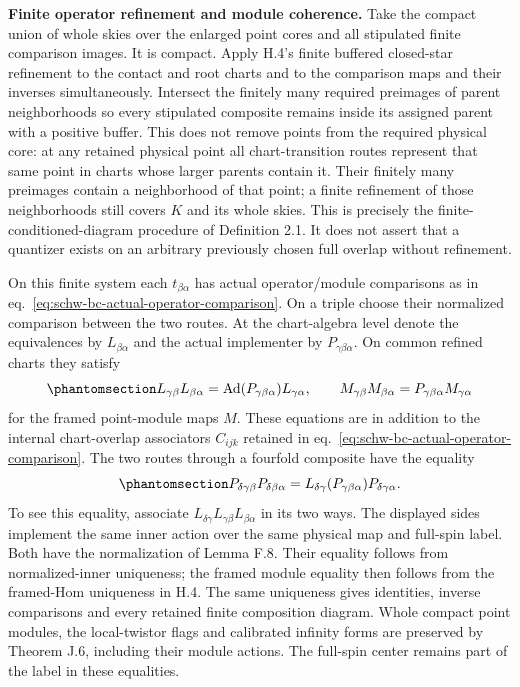\documentclass[
  english,
  11pt,
  reqno]{amsart}
\begin{document}
\textbf{Finite operator refinement and module coherence.} Take the
compact union of whole skies over the enlarged point cores and all
stipulated finite comparison images. It is compact. Apply H.4's finite
buffered closed-star refinement to the contact and root charts and to
the comparison maps and their inverses simultaneously. Intersect the
finitely many required preimages of parent neighborhoods so every
stipulated composite remains inside its assigned parent with a positive
buffer. This does not remove points from the required physical core: at
any retained physical point all chart-transition routes represent that
same point in charts whose larger parents contain it. Their finitely
many preimages contain a neighborhood of that point; a finite refinement
of those neighborhoods still covers \(K\) and its whole skies. This is
precisely the finite-conditioned-diagram procedure of Definition 2.1. It
does not assert that a quantizer exists on an arbitrary previously
chosen full overlap without refinement.

On this finite system each \(t_{\beta\alpha}\) has actual
operator/module comparisons as in
eq.~\ref{eq:schw-bc-actual-operator-comparison}. On a triple choose
their normalized comparison between the two routes. At the chart-algebra
level denote the equivalences by \(L_{\beta\alpha}\) and the actual
implementer by \(P_{\gamma\beta\alpha}\). On common refined charts they
satisfy
\begin{equation}\protect\phantomsection\label{eq:schw-bc-operator-triple}{
 L_{\gamma\beta}L_{\beta\alpha}
   =\operatorname{Ad}(P_{\gamma\beta\alpha})L_{\gamma\alpha},
 \qquad
 M_{\gamma\beta}M_{\beta\alpha}
   =P_{\gamma\beta\alpha}M_{\gamma\alpha}
}\end{equation} for the framed point-module maps \(M\). These equations
are in addition to the internal chart-overlap associators \(C_{ijk}\)
retained in eq.~\ref{eq:schw-bc-actual-operator-comparison}. The two
routes through a fourfold composite have the equality
\begin{equation}\protect\phantomsection\label{eq:schw-bc-operator-quadruple}{
 P_{\delta\gamma\beta}P_{\delta\beta\alpha}
 =L_{\delta\gamma}(P_{\gamma\beta\alpha})P_{\delta\gamma\alpha}.
}\end{equation} To see this equality, associate
\(L_{\delta\gamma}L_{\gamma\beta}L_{\beta\alpha}\) in its two ways. The
displayed sides implement the same inner action over the same physical
map and full-spin label. Both have the normalization of Lemma F.8. Their
equality follows from normalized-inner uniqueness; the framed module
equality then follows from the framed-Hom uniqueness in H.4. The same
uniqueness gives identities, inverse comparisons and every retained
finite composition diagram. Whole compact point modules, the
local-twistor flags and calibrated infinity forms are preserved by
Theorem J.6, including their module actions. The full-spin center
remains part of the label in these equalities.
\end{document}
